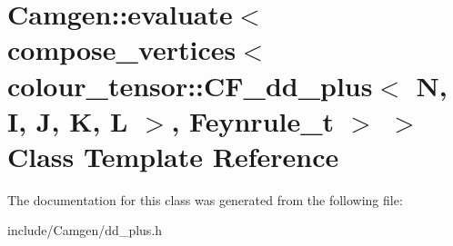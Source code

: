 \hypertarget{a00157}{}\section{Camgen\+:\+:evaluate$<$ compose\+\_\+vertices$<$ colour\+\_\+tensor\+:\+:C\+F\+\_\+dd\+\_\+plus$<$ N, I, J, K, L $>$, Feynrule\+\_\+t $>$ $>$ Class Template Reference}
\label{a00157}


The documentation for this class was generated from the following file\+:\begin{DoxyCompactItemize}
\item 
include/\+Camgen/dd\+\_\+plus.\+h\end{DoxyCompactItemize}
